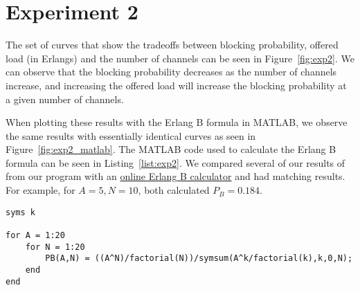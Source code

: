 \section*{Experiment 2}
The set of curves that show the tradeoffs between blocking probability, offered load (in Erlangs) and the number of channels can be seen in Figure~\ref{fig:exp2}. We can observe that the blocking probability decreases as the number of channels increase, and increasing the offered load will increase the blocking probability at a given number of channels.

When plotting these results with the Erlang B formula in MATLAB, we observe the same results with essentially identical curves as seen in Figure~\ref{fig:exp2_matlab}. The MATLAB code used to calculate the Erlang B formula can be seen in Listing~\ref{list:exp2}. We compared several of our results of from our program with an \href{https://owenduffy.net/traffic/erlangb.htm}{online Erlang B calculator} and had matching results. For example, for $A = 5, N = 10$, both calculated $P_B = 0.184$. 

\begin{lstlisting}[style=Matlab-editor,firstnumber=3,caption=Erlang B Formula, label=list:exp2]
syms k

for A = 1:20
	for N = 1:20
		PB(A,N) = ((A^N)/factorial(N))/symsum(A^k/factorial(k),k,0,N);
	end
end
\end{lstlisting}

